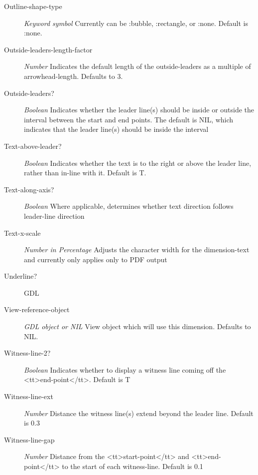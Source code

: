 \documentclass [11pt]{book}
\begin{document}
\begin{itemize}
\begin{description}
\item [Outline-shape-type]
\emph{Keyword symbol} Currently can be :bubble, :rectangle, or :none. Default is :none.


\item [Outside-leaders-length-factor]
\emph{Number} Indicates the default length of the outside-leaders as a multiple of arrowhead-length.
Defaults to 3.


\item [Outside-leaders?]
\emph{Boolean} Indicates whether the leader line(s) should be inside or outside the interval between the start and
end points. The default is NIL, which indicates that the leader line(s) should be inside the interval


\item [Text-above-leader?]
\emph{Boolean} Indicates whether the text is to the right or above the leader line, rather than in-line with it. Default is T.


\item [Text-along-axis?]
\emph{Boolean} Where applicable, determines whether text direction follows leader-line direction


\item [Text-x-scale]
\emph{Number in Percentage} Adjusts the character width for the dimension-text and currently only applies only to PDF output


\item [Underline?]
GDL


\item [View-reference-object]
\emph{GDL object or NIL} View object which will use this dimension. Defaults to NIL.


\item [Witness-line-2?]
\emph{Boolean} Indicates whether to display a witness line coming off the <tt>end-point</tt>. Default is T


\item [Witness-line-ext]
\emph{Number} Distance the witness line(s) extend beyond the leader line. Default is 0.3


\item [Witness-line-gap]
\emph{Number} Distance from the <tt>start-point</tt> and <tt>end-point</tt> to the start of each witness-line. Default is 0.1



\end{description}
\end{itemize}
\end{document}
